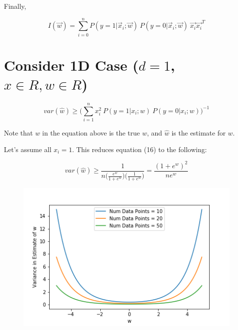 \documentclass{article}
\begin{document}
Finally,

\begin{equation}
    I(\vec{w}) = \sum_{i = 0}^n P(y = 1|\vec{x}_i; \vec{w})\ P(y = 0|\vec{x}_i; \vec{w})\ \vec{x_i}\vec{x_i}^T
\end{equation}

\section{Consider 1D Case ($d = 1$, $x \in R, w \in R$)}

\begin{equation}
    var(\hat{w}) \geq \Big( \sum_{i=1}^{n} x_i^2\ P(y = 1|x_i; w)\ P(y = 0|x_i; w) \Big)^{-1}
\end{equation}

Note that $w$ in the equation above is the true $w$, and $\hat{w}$ is the estimate for $w$.

Let's assume all $x_i = 1$. This reduces equation (16) to the following:

\begin{equation}
    var(\hat{w}) \geq \frac{1}{n \Big(\frac{e^w}{1+e^w}\Big)\Big(\frac{1}{1+e^w}\Big)} = \frac{(1 + e^w)^2}{ne^w}
\end{equation}

\begin{figure}[h!]
    \includegraphics[width=\linewidth]{out.png}
\end{figure}
\end{document}

